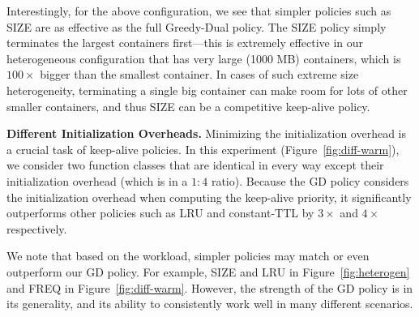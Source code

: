 Interestingly, for the above  configuration, we see that simpler policies such as SIZE are as effective as the full Greedy-Dual policy. 
The SIZE policy simply terminates the largest containers first---this is extremely effective in our heterogeneous configuration that has very large (1000 MB) containers, which is $100\times$ bigger than the smallest container.  
In cases of such extreme size heterogeneity, terminating a single big container can make room for lots of other smaller containers, and thus SIZE can be a competitive keep-alive policy. 






\noindent \textbf{Different Initialization Overheads.} Minimizing the initialization overhead is a crucial task of keep-alive policies.
In this experiment (Figure~\ref{fig:diff-warm}), we consider two function classes that are identical in every way except their initialization overhead (which is in a $1:4$ ratio). 
Because the GD policy considers the initialization overhead when computing the keep-alive priority, it significantly outperforms other policies such as LRU and constant-TTL by $3\times$ and $4\times$ respectively.

We note that based on the workload, simpler policies may match or even outperform our GD policy.
For example, SIZE and LRU in Figure~\ref{fig:heterogen} and FREQ in Figure~\ref{fig:diff-warm}. 
However, the strength of the GD policy is in its generality, and its ability to consistently work well in many different scenarios.



